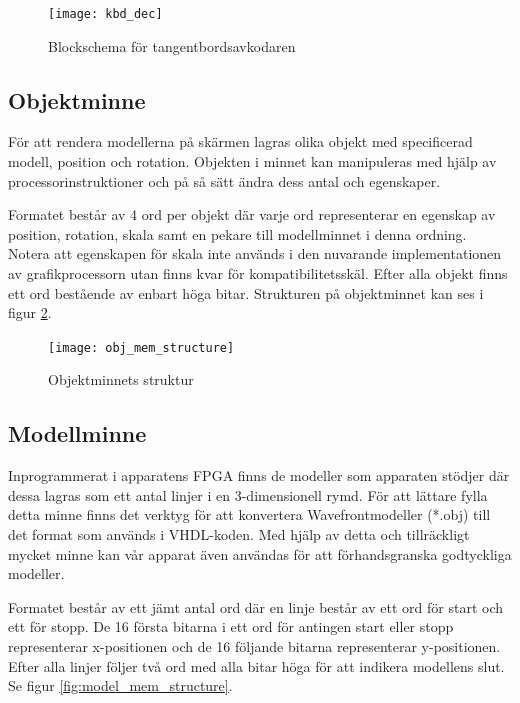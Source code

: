 \documentclass[a4paper]{article}
\begin{document}
    \begin{figure}[H]
        \centering
        \texttt{[image: kbd\_dec]}
        \caption{Blockschema för tangentbordsavkodaren}
        \label{fig:kbd_dec}
    \end{figure}

    \subsection{Objektminne}

    För att rendera modellerna på skärmen lagras olika objekt med specificerad
    modell, position och rotation. Objekten i minnet kan manipuleras med hjälp av
    processorinstruktioner och på så sätt ändra dess antal och egenskaper. 

    Formatet består av 4 ord per objekt där varje ord representerar en egenskap av
    position, rotation, skala samt en pekare till modellminnet i denna ordning.
    Notera att egenskapen för skala inte används i den nuvarande implementationen av
    grafikprocessorn utan finns kvar för kompatibilitetsskäl. Efter alla objekt
    finns ett ord bestående av enbart höga bitar. Strukturen på objektminnet kan ses
    i figur \ref{fig:obj_mem_structure}. 

    \begin{figure}[H]
        \centering
        \texttt{[image: obj\_mem\_structure]}
        \caption{Objektminnets struktur}
        \label{fig:obj_mem_structure}
    \end{figure}

    \subsection{Modellminne}
    Inprogrammerat i apparatens FPGA finns de modeller som apparaten stödjer där dessa lagras som
    ett antal linjer i en 3-dimensionell rymd. För att lättare fylla detta minne finns det verktyg
    för att konvertera Wavefrontmodeller (*.obj) till det format som används i VHDL-koden. Med 
    hjälp av detta och tillräckligt mycket minne kan vår apparat även användas för att
    förhandsgranska godtyckliga modeller.

    Formatet består av ett jämt antal ord där en linje består av ett ord för start och ett för
    stopp. De 16 första bitarna i ett ord för antingen start eller stopp representerar x-positionen
    och de 16 följande bitarna representerar y-positionen. Efter alla linjer följer två ord med 
    alla bitar höga för att indikera modellens slut. Se figur \ref{fig:model_mem_structure}.
\end{document}
